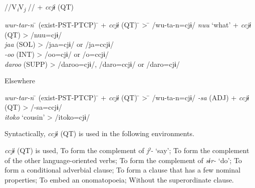   \ex //V\textit{\textsubscript{i}}V\textit{\textsubscript{j} }// + \textit{ccjɨ} (QT)\\
  \begin{tabbing}
  \textit{wur-tar-n} \hspace{\tabcolsep}\=\hspace{\tabcolsep} (exist-PST-PTCP) \hspace{\tabcolsep}\=\hspace{\tabcolsep} +  \textit{ccjɨ}  (QT) \hspace{\tabcolsep}\=\hspace{\tabcolsep} > \hspace{\tabcolsep}\=\hspace{\tabcolsep} /wu-ta-n=cjɨ/\kill
  \textit{nuu}  \> ‘what’ \> +  \textit{ccjɨ}  (QT) \> > \> /nuu=cjɨ/\\
  \textit{jaa} \> (SOL) \>   \>    > \> /jaa=cjɨ/ or /ja=ccjɨ/\\
  \textit{{}-oo} \> (INT)   \>  \>   > \> /oo=cjɨ/ or /o=ccjɨ/\\
  \textit{daroo} \> (SUPP)   \>  \>   > \> /daroo=cjɨ/, /daro=ccjɨ/ or /daro=cjɨ/
  \end{tabbing}

  \ex Elsewhere\\
  \begin{tabbing}
  \textit{wur-tar-n} \hspace{\tabcolsep}\=\hspace{\tabcolsep} (exist-PST-PTCP) \hspace{\tabcolsep}\=\hspace{\tabcolsep} +  \textit{ccjɨ}  (QT) \hspace{\tabcolsep}\=\hspace{\tabcolsep} > \hspace{\tabcolsep}\=\hspace{\tabcolsep} /wu-ta-n=cjɨ/\kill
  \textit{{}-sa} \> (ADJ)  \> +  \textit{ccjɨ}  (QT)  \> > \> /-sa=ccjɨ/\\
  \textit{itoko} \> ‘cousin’    \> \>   > \> /itoko=cjɨ/
  \end{tabbing}
  \z
\z

Syntactically, \textit{ccjɨ} (QT) is used in the following environments.

\ea\label{ex:10.61}\textit{ccjɨ} (QT) is used,
  \ea  To form the complement of \textit{jˀ-} ‘say’;
  \ex  To form the complement of the other language-oriented verbs;
  \ex  To form the complement of \textit{sɨr-} ‘do’;
  \ex  To form a conditional adverbial clause;
  \ex  To form a clause that has a few nominal properties;
  \ex  To embed an onomatopoeia;
  \ex  Without the superordinate clause.
  \z
\z


